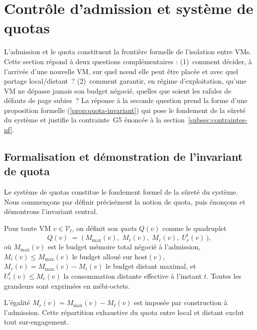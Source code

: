 \section{Contrôle d'admission et système de quotas}
\label{sec:quotas}

L'admission et le quota constituent la frontière formelle de l'isolation entre VMs. Cette section répond à deux questions complémentaires : (1)~comment décider, à l'arrivée d'une nouvelle VM, sur quel nœud elle peut être placée et avec quel partage local/distant~? (2)~comment garantir, en régime d'exploitation, qu'une VM ne dépasse jamais son budget négocié, quelles que soient les rafales de défauts de page subies~? La réponse à la seconde question prend la forme d'une proposition formelle (\autoref{prop:quota-invariant}) qui pose le fondement de la sûreté du système et justifie la contrainte~G5 énoncée à la section~\ref{subsec:contraintes-nf}.

\subsection{Formalisation et démonstration de l'invariant de quota}
\label{subsec:invariant-quota}

Le système de quotas constitue le fondement formel de la sûreté du système. Nous commençons par définir précisément la notion de quota, puis énonçons et démontrons l'invariant central.

\begin{definition}
\label{def:quota}
Pour toute VM $v \in \mathcal{V}_t$, on définit son \emph{quota} $Q(v)$ comme le quadruplet
\[
    Q(v) \;=\; \bigl(\, M_{\max}(v),\; M_{\ell}(v),\; M_r(v),\; U_r^t(v) \,\bigr),
\]
où $M_{\max}(v)$ est le budget mémoire total négocié à l'admission, $M_{\ell}(v) \leq M_{\max}(v)$ le budget alloué sur $\mathrm{host}(v)$, $M_r(v) = M_{\max}(v) - M_{\ell}(v)$ le budget distant maximal, et $U_r^t(v) \leq M_r(v)$ la consommation distante effective à l'instant $t$. Toutes les grandeurs sont exprimées en mébi-octets.
\end{definition}

L'égalité $M_r(v) = M_{\max}(v) - M_{\ell}(v)$ est imposée par construction à l'admission. Cette répartition exhaustive du quota entre local et distant exclut tout sur-engagement.

